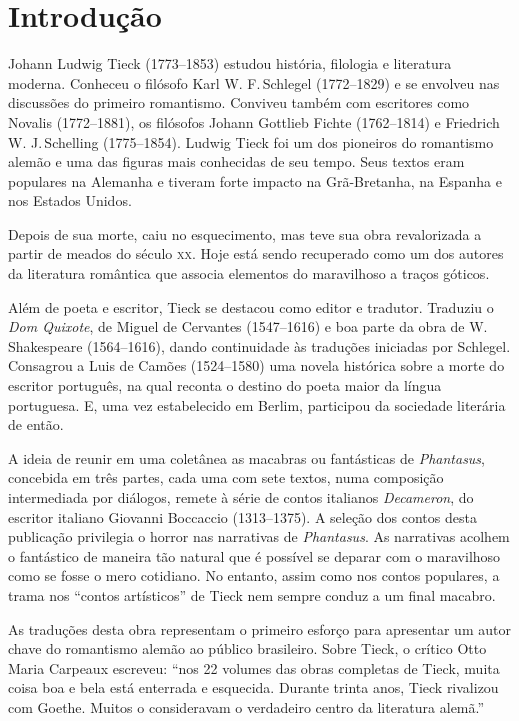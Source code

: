 \documentclass[12pt]{extarticle}
\begin{document}
\tableofcontents


\section{Introdução}

Johann Ludwig Tieck (1773--1853) estudou história, filologia e literatura moderna.
Conheceu o filósofo Karl W. F.\,Schlegel (1772--1829) e se envolveu nas discussões do primeiro romantismo. 
Conviveu também com escritores como 
Novalis (1772--1881), 
os filósofos 
Johann Gottlieb Fichte (1762--1814) e 
Friedrich W. J.\,Schelling (1775--1854). 
Ludwig Tieck foi um dos pioneiros do romantismo alemão e uma das figuras mais conhecidas de seu tempo. 
Seus textos eram populares na Alemanha e tiveram forte impacto na Grã-Bretanha, na Espanha e nos Estados Unidos.

Depois de sua morte, caiu no esquecimento, mas teve sua obra revalorizada a partir de meados do século \textsc{xx}. 
Hoje está sendo recuperado como um dos autores da literatura romântica que associa elementos do maravilhoso a traços góticos.

Além de poeta e escritor, Tieck se destacou como editor e tradutor.
Traduziu o \textit{Dom Quixote}, de Miguel de Cervantes (1547--1616) e boa parte da obra de 
W.\,Shakespeare (1564--1616), dando continuidade às traduções iniciadas por Schlegel.
Consagrou a Luis de Camões (1524–1580) uma novela histórica sobre a morte 
do escritor português, na qual reconta o destino do poeta maior da língua portuguesa. E, uma vez 
estabelecido em Berlim, participou da sociedade literária de então.

A ideia de reunir em uma coletânea as macabras ou fantásticas de 
\textit{Phantasus}, concebida em três partes, cada uma com sete textos,
numa composição intermediada por diálogos, remete à série de contos italianos \textit{Decameron}, do escritor italiano Giovanni Boccaccio (1313--1375). 
A seleção dos contos desta publicação privilegia o horror nas narrativas de \textit{Phantasus}. As narrativas acolhem o fantástico de maneira tão natural que é possível 
se deparar com o maravilhoso como se fosse o mero cotidiano. No entanto, assim como nos contos populares, a trama nos ``contos artísticos'' de Tieck nem sempre conduz a um final macabro. 

As traduções desta obra representam o primeiro esforço para apresentar um autor chave do romantismo alemão ao público brasileiro. Sobre Tieck, o crítico Otto Maria Carpeaux escreveu: ``nos 22 volumes das obras completas de Tieck, muita coisa boa e bela está enterrada e esquecida. Durante trinta anos, Tieck rivalizou com Goethe. 
Muitos o consideravam o verdadeiro centro da literatura alemã.''
\end{document}
